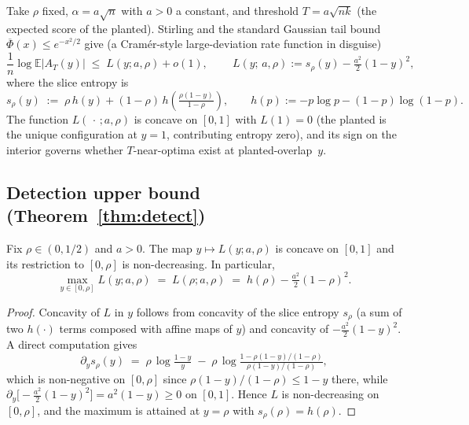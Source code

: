 Take $\rho$ fixed, $\alpha=a\sqrt n$ with $a>0$ a constant, and threshold $T = a\sqrt{nk}$
(the expected score of the planted). Stirling and the standard Gaussian tail bound
$\overline\Phi(x)\leq e^{-x^2/2}$ give (a Cram\'er-style large-deviation rate function \cite{cramer-original} in disguise)
\begin{equation}
\frac{1}{n}\log\mathbb E|A_T(y)| \;\leq\; L(y;a,\rho) + o(1),\qquad
\boxed{\ L(y;\,a,\rho) := s_\rho(y) - \tfrac{a^2}{2}(1-y)^2,\ }
\label{eq:Ldef}
\end{equation}
where the slice entropy is
\begin{equation}
s_\rho(y) \;:=\; \rho\,h(y) + (1-\rho)\,h\!\left(\tfrac{\rho(1-y)}{1-\rho}\right),
\qquad h(p) := -p\log p - (1-p)\log(1-p).
\label{eq:srho}
\end{equation}
The function $L(\,\cdot\,;a,\rho)$ is concave on $[0,1]$ with $L(1)=0$ (the planted is the
unique configuration at $y=1$, contributing entropy zero), and its sign on the interior
governs whether $T$-near-optima exist at planted-overlap~$y$.

\subsection{Detection upper bound (Theorem~\ref{thm:detect})}

\begin{lemma}\label{lem:endpoint-max}
Fix $\rho\in(0,1/2)$ and $a>0$. The map $y\mapsto L(y;a,\rho)$ is concave on $[0,1]$
and its restriction to $[0,\rho]$ is non-decreasing. In particular,
\[
\max_{y\in[0,\rho]} L(y;a,\rho) \;=\; L(\rho;a,\rho) \;=\; h(\rho)-\tfrac{a^2}{2}(1-\rho)^2.
\]
\end{lemma}
\begin{proof}
Concavity of $L$ in $y$ follows from concavity of the slice entropy $s_\rho$
(a sum of two $h(\cdot)$ terms composed with affine maps of $y$) and concavity of
$-\tfrac{a^2}{2}(1-y)^2$. A direct computation gives
\[
\partial_y s_\rho(y) \;=\; \rho\,\log\!\tfrac{1-y}{y}
   \;-\;\rho\,\log\!\tfrac{1-\rho(1-y)/(1-\rho)}{\rho(1-y)/(1-\rho)},
\]
which is non-negative on $[0,\rho]$ since
$\rho(1-y)/(1-\rho)\le 1-y$ there, while
$\partial_y\bigl[-\tfrac{a^2}{2}(1-y)^2\bigr]=a^2(1-y)\ge 0$ on $[0,1]$. Hence $L$ is
non-decreasing on $[0,\rho]$, and the maximum is attained at $y=\rho$ with
$s_\rho(\rho)=h(\rho)$.
\end{proof}

